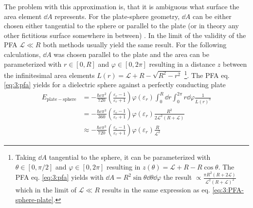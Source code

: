 The problem with this approximation is, that it is ambiguous what surface the area element $\dd A$ represents. For the plate-sphere geometry, $\dd A$ can be either chosen either tangential to the sphere or parallel to the plate (or in theory any other fictitious surface somewhere in between) \cite{Bulgac_2006}.
In the limit of the validity of the PFA $\mathscr{L} \ll R$ both methods usually yield the same result.
For the following calculations, $\dd A$ was chosen parallel to the plate and the area can be parameterized with $r\in [0, R]$ and $\varphi \in [0, 2\pi]$ resulting in a distance $z$ between the infinitesimal area elements $L(r) = \mathscr{L} + R - \sqrt{R^2 - r^2}$ \footnote{Taking $\dd A$ tangential to the sphere, it can be parameterized with $\theta \in [0, \pi/2]$ and $\varphi \in [0, 2\pi]$ resulting in $z(\theta) = \mathscr{L} + R - R\cos\theta$. The PFA eq. \eqref{eq:3:pfa} yields with $\dd A = R^2\sin\theta\dd\theta\dd\varphi$ the result $\propto \frac{\pi R^2(R + 2\mathscr{L})}{\mathscr{L}^2(R+\mathscr{L})^2}$ which in the limit of $\mathscr{L} \ll R$ results in the same expression as eq. \eqref{eq:3:PFA-sphere-plate}.}. The PFA eq. \eqref{eq:3:pfa} yields for a dielectric sphere against a perfectly conducting plate
\begin{align}
  E_\mathrm{plate-sphere} &= -\frac{\hbar c \pi^2}{720} \left(\frac{\varepsilon_r - 1}{\varepsilon_r + 1}\right) \varphi(\varepsilon_r) \int_0^R \dd r \int_0^{2\pi} r\dd \varphi \frac{1}{L(r)^3} \\
  &= -\frac{\hbar c \pi^3}{360} \left(\frac{\varepsilon_r - 1}{\varepsilon_r + 1}\right) \varphi(\varepsilon_r) \frac{R^2}{2\mathscr{L}^2(R + \mathscr{L})} \\
  &\approx -\frac{\hbar c \pi^3}{720} \left(\frac{\varepsilon_r - 1}{\varepsilon_r + 1}\right) \varphi(\varepsilon_r) \frac{R}{\mathscr{L}^2} \label{eq:3:PFA-sphere-plate}
\end{align}
